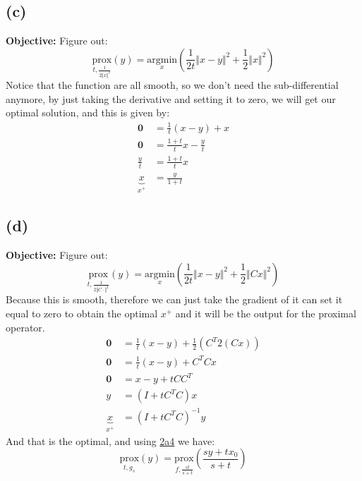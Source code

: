 \documentclass[]{article}
\begin{document}
        
    \subsection*{(c)}
        \textbf{Objective: } Figure out: 
        $$
            \underset{t, \frac{1}{2 \Vert x\Vert^2}}{\text{prox}}(y)
            = 
            \underset{x}{\text{argmin}} \left(
                \frac{1}{2t}\Vert x - y\Vert^2 + \frac{1}{2}\Vert x\Vert^2
            \right)
        $$
        Notice that the function are all smooth, so we don't need the sub-differential anymore, by just taking the derivative and setting it to zero, we will get our optimal solution, and this is given by: 
        \begin{align*}\tag{2c1}\label{eqn:2c1}
            \mathbf{0} &= \frac{1}{t}(x - y) + x
            \\
            \mathbf{0} &= \frac{1 + t}{t}x - \frac{y}{t} 
            \\
            \frac{y}{t} &= \frac{1 + t}{t}x 
            \\
            \underbrace{x}_{x^+} &= \frac{y}{1 + t}
        \end{align*}
    
    \subsection*{(d)}
        \textbf{Objective: } Figure out: 
        $$
        \underset{t, \frac{1}{2 \Vert C\cdot \Vert^2}}{\text{prox}}(y)
            = 
            \underset{x}{\text{argmin}} \left(
                \frac{1}{2t}\Vert x - y\Vert^2 + \frac{1}{2}\Vert Cx\Vert^2
            \right)
        $$
        Because this is smooth, therefore we can just take the gradient of it can set it equal to zero to obtain the optimal $x^+$ and it will be the output for the proximal operator. 
        \begin{align*}\tag{2d1}\label{eqn:2d1}
            \mathbf{0} &= \frac{1}{t}(x - y) + \frac{1}{2}(C^T2(Cx)) \\
            \mathbf{0} &= \frac{1}{t}(x - y) + C^TCx\\ 
            \mathbf{0} &= x - y + tCC^T \\
            y &= (I + tC^TC)x \\
            \underbrace{x}_{x^+} &= (I + tC^TC)^{-1}y
        \end{align*}
        And that is the optimal, and using \hyperref[eqn:2a4]{2a4} we have: 
        $$
            \underset{t, g_s}{\text{prox}}(y) = \underset{f, \frac{st}{s + t}}{\text{prox}}
            \left(
                \frac{sy + tx_0}{s + t}
            \right)
        $$
        

    
\end{document}
